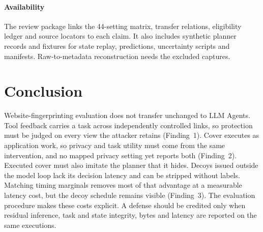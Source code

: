\paragraph{Availability}
The review package links the 44-setting matrix, transfer relations, eligibility ledger and source locators to each claim. It also includes synthetic planner records and fixtures for state replay, predictions, uncertainty scripts and manifests. Raw-to-metadata reconstruction needs the excluded captures.

\section{Conclusion}
Website-fingerprinting evaluation does not transfer unchanged to LLM Agents. Tool feedback carries a task across independently controlled links, so protection must be judged on every view the attacker retains (Finding~1). Cover executes as application work, so privacy and task utility must come from the same intervention, and no mapped privacy setting yet reports both (Finding~2). Executed cover must also imitate the planner that it hides. Decoys issued outside the model loop lack its decision latency and can be stripped without labels. Matching timing marginals removes most of that advantage at a measurable latency cost, but the decoy schedule remains visible (Finding~3). The evaluation procedure makes these costs explicit. A defense should be credited only when residual inference, task and state integrity, bytes and latency are reported on the same executions.
